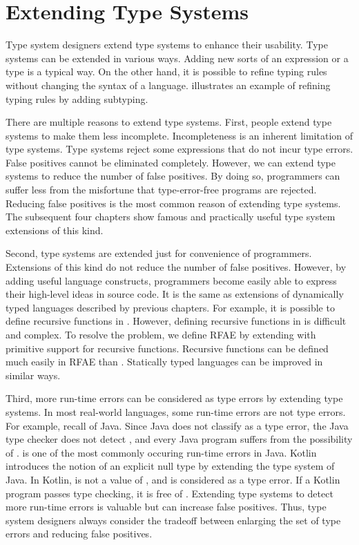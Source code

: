 \section{Extending Type Systems}

Type system designers extend type systems to enhance their usability. Type
systems can be extended in various ways. Adding new sorts of an expression or
a type is a typical way. On the other hand, it is possible to refine typing
rules without changing the syntax of a language. 
illustrates an example of refining typing rules by adding subtyping.

There are multiple reasons to extend type systems. First, people extend type
systems to make them less incomplete. Incompleteness is an inherent limitation
of type systems. Type systems reject some expressions that do not incur type
errors. False positives cannot be eliminated completely. However, we can extend
type systems to reduce the number of false positives. By doing so, programmers
can suffer less from the misfortune that type-error-free programs are rejected.
Reducing false positives is the most common reason of extending type systems.
The subsequent four chapters show famous and practically useful type system
extensions of this kind.

Second, type systems are extended just for convenience of programmers.
Extensions of this kind do not reduce the number of false positives. However, by
adding useful language constructs, programmers become easily able to express
their high-level ideas in source code. It is the same as extensions of
dynamically typed languages
described by previous chapters. For example, it is possible to define recursive
functions in \plang. However, defining recursive functions in \plang is difficult
and complex. To resolve the problem, we define \textsf{RFAE} by extending \plang
with primitive support for recursive functions. Recursive functions can be
defined much easily in \textsf{RFAE} than \plang. Statically typed languages can
be improved in similar ways.

Third, more run-time errors can be considered as type errors by extending type
systems. In most real-world languages, some run-time errors are not type errors.
For example, recall  of Java. Since Java does not
classify  as a type error, the Java type checker does
not detect , and every Java program suffers from the
possibility of .  is one
of the most commonly occuring run-time errors in Java. Kotlin introduces the
notion of an explicit null type by extending the type system of Java. In Kotlin,
 is not a value of , and  is
considered as a type error. If a Kotlin program passes type checking, it is free
of . Extending type systems to detect more run-time
errors is valuable but can increase false positives. Thus, type system designers
always consider the tradeoff between enlarging the set of type errors and reducing false
positives.

